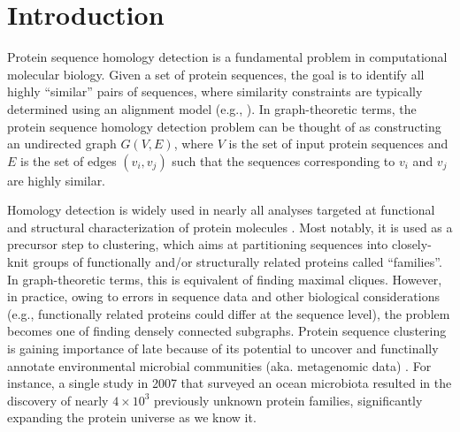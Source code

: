 \documentclass[10pt,journal,letterpaper,compsoc]{IEEEtran}
\begin{document}
\maketitle

%
\IEEEpeerreviewmaketitle

\section{Introduction}
\label{secIntroduction}

Protein sequence homology detection is a fundamental problem in computational molecular biology. Given a set of protein sequences, the goal is to identify all highly ``similar'' pairs of sequences, where similarity constraints are typically determined using an alignment model (e.g., \cite{Needleman70,Smith81}). In graph-theoretic terms, the protein sequence homology detection problem can be thought of as constructing an undirected graph $G(V,E)$, where $V$ is the set of input protein sequences and $E$ is the set of edges $(v_i,v_j)$ such that the sequences corresponding to $v_i$ and $v_j$ are highly similar.

Homology detection is widely used in nearly all analyses targeted at functional and structural characterization of protein molecules \cite{Kriventseva01}. Most notably, it is used as a precursor step to clustering, which aims at partitioning sequences into closely-knit groups of functionally and/or structurally related proteins called ``families''. In graph-theoretic terms, this is equivalent of finding maximal cliques. However, in practice, owing to errors in sequence data and other biological considerations (e.g., functionally related proteins could differ at the sequence level), the problem becomes one of finding densely connected subgraphs. Protein sequence clustering is gaining importance of late because of its potential to uncover and functinally annotate environmental microbial communities (aka.  metagenomic data) \cite{Handelsman04}. For instance, a single study in 2007 that surveyed an ocean microbiota \cite{Yooseph07} resulted in the discovery of nearly $4\times 10^3$ previously unknown protein families, significantly expanding the protein universe as we know it. %
\end{document}
